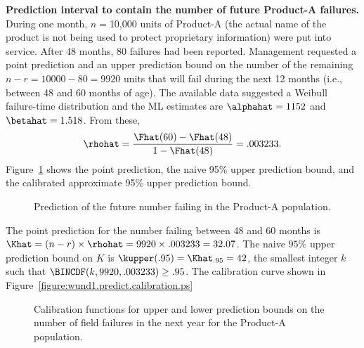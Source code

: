 \begin{example}
{\bf Prediction interval to contain the number of future Product-A
failures.} During one month, $n=$10,000 units of Product-A (the actual
name of the product is not being used to protect proprietary
information) were put into service.  After 48 months, 80 failures had
been reported.  Management requested a point prediction and an upper
prediction bound on the number of the remaining $ n-r=10000-80=9920$
units that will fail during the next 12 months (i.e., between
48 and 60 months of age).  The available data suggested a Weibull
failure-time distribution and the ML estimates are $\alphahat=1152$
and $\betahat=1.518$. From these,
\begin{displaymath} 	
\rhohat= \frac{\Fhat(60)-\Fhat(48)} {1 -\Fhat(48)}=.003233.  	
\end{displaymath} 
Figure~\ref{figure:wund.pred.exfig.ps} shows the point prediction,
the naive 95\% upper prediction bound, and the calibrated approximate
95\% upper prediction bound.
\begin{figure}
\caption{Prediction of the future number failing in the Product-A population.}
\label{figure:wund.pred.exfig.ps}
\end{figure}
The point prediction for the number failing between 48 and 60 months is 
$\Khat = (n-r) \times \rhohat = 9920 \times .003233=32.07$.
The naive  $95\%$  upper prediction bound on $K$ is 
$\kupper(.95)=\Khat_{.95}=42$, the 
smallest integer $k$ such that $\BINCDF(k,9920,.003233) \geq .95$.
The calibration curve shown in 
Figure~\ref{figure:wund1.predict.calibration.ps}
\begin{figure}
\caption{Calibration functions
for upper and lower prediction bounds on 
the number of field failures in the next year for the Product-A population.}

\end{figure}
\end{example}
